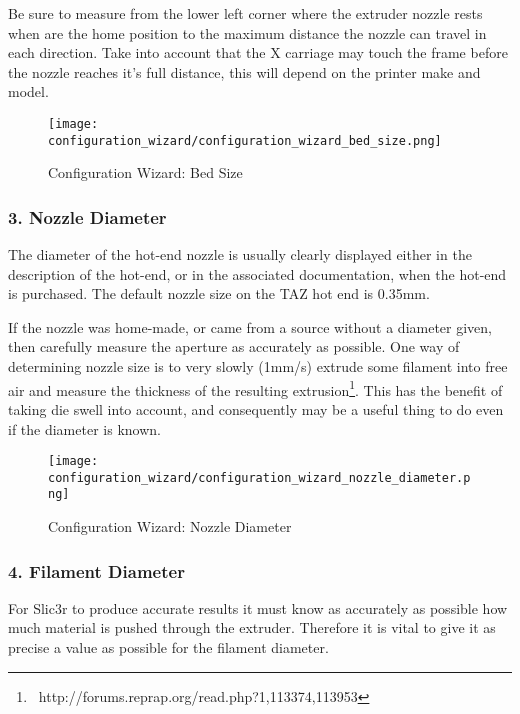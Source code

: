 Be sure to measure from the lower left corner where the extruder nozzle rests when are the home position to the maximum distance the nozzle can travel in each direction.  Take into account that the X carriage may touch the frame before the nozzle reaches it's full distance, this will depend on the printer make and model.

\begin{figure}[H]
\centering
\texttt{[image: configuration\_wizard/configuration\_wizard\_bed\_size.png]}
\caption{Configuration Wizard: Bed Size}
\label{fig:configuration_wizard_bed_size}
\end{figure}

\newpage
\subsubsection{3. Nozzle Diameter}
\label{sub:3_nozzle_diameter}
The diameter of the hot-end nozzle is usually clearly displayed either in the description of the hot-end, or in the associated documentation, when the hot-end is purchased.  The default nozzle size on the TAZ hot end is 0.35mm.

If the nozzle was home-made, or came from a source without a diameter given, then carefully measure the aperture as accurately as possible.  One way of determining nozzle size is to very slowly (1mm/s) extrude some filament into free air and measure the thickness of the resulting extrusion\footnote{\	http://forums.reprap.org/read.php?1,113374,113953}.  This has the benefit of taking die swell into account, and consequently may be a useful thing to do even if the diameter is known.

\begin{figure}[H]
\centering
\texttt{[image: configuration\_wizard/configuration\_wizard\_nozzle\_diameter.png]}
\caption{Configuration Wizard: Nozzle Diameter}
\label{fig:configuration_wizard_nozzle_diameter}
\end{figure}

\newpage
\subsubsection{4. Filament Diameter}
\label{sub:4_filament_diameter}
For Slic3r to produce accurate results it must know as accurately as possible how much material is pushed through the extruder.  Therefore it is vital to give it as precise a value as possible for the filament diameter.

